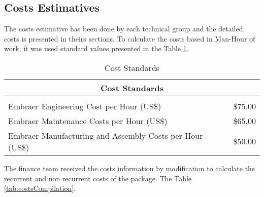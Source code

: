 \subsection{Costs Estimatives}

The costs estimative has been done by each technical group and the detailed costs is presented in theirs sections. 
To calculate the costs based in Man-Hour of work, it was used standard values presented in the Table \ref{tab:costStandards}.


\begin{table}[htbp]
  \centering
  \caption{Cost Standards}
    \begin{tabular}{rr}
    \toprule
    \multicolumn{2}{c}{\textbf{Cost Standards}} \\
    \midrule
    \multicolumn{1}{l}{} &  \\
    \multicolumn{1}{l}{Embraer Engineering Cost per Hour (US\$)} & \$75.00 \\
    \multicolumn{1}{l}{Embraer Maintenance Costs per Hour (US\$)} & \$65.00 \\
    \multicolumn{1}{l}{Embraer Manufacturing and Assembly Costs per Hour (US\$)} & \$50.00 \\
    \bottomrule
    \end{tabular}%
  \label{tab:costStandards}%
\end{table}%


The finance team received the costs information by modification to calculate the recurrent and non recurrent costs of the package. The Table \ref{tab:costsCompilation}.

